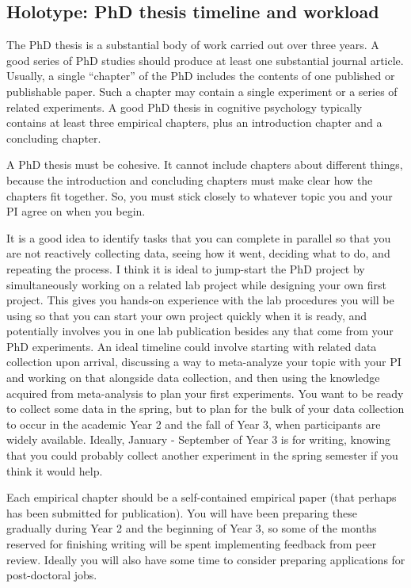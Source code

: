 \documentclass[
  12pt,
]{book}
\begin{document}
\subsection{Holotype: PhD thesis timeline and workload}\label{holotype-phd-thesis-timeline-and-workload}

The PhD thesis is a substantial body of work carried out over three years. A good series of PhD studies should produce at least one substantial journal article. Usually, a single ``chapter'' of the PhD includes the contents of one published or publishable paper. Such a chapter may contain a single experiment or a series of related experiments. A good PhD thesis in cognitive psychology typically contains at least three empirical chapters, plus an introduction chapter and a concluding chapter.

A PhD thesis must be cohesive. It cannot include chapters about different things, because the introduction and concluding chapters must make clear how the chapters fit together. So, you must stick closely to whatever topic you and your PI agree on when you begin.

It is a good idea to identify tasks that you can complete in parallel so that you are not reactively collecting data, seeing how it went, deciding what to do, and repeating the process. I think it is ideal to jump-start the PhD project by simultaneously working on a related lab project while designing your own first project. This gives you hands-on experience with the lab procedures you will be using so that you can start your own project quickly when it is ready, and potentially involves you in one lab publication besides any that come from your PhD experiments. An ideal timeline could involve starting with related data collection upon arrival, discussing a way to meta-analyze your topic with your PI and working on that alongside data collection, and then using the knowledge acquired from meta-analysis to plan your first experiments. You want to be ready to collect some data in the spring, but to plan for the bulk of your data collection to occur in the academic Year 2 and the fall of Year 3, when participants are widely available. Ideally, January - September of Year 3 is for writing, knowing that you could probably collect another experiment in the spring semester if you think it would help.

Each empirical chapter should be a self-contained empirical paper (that perhaps has been submitted for publication). You will have been preparing these gradually during Year 2 and the beginning of Year 3, so some of the months reserved for finishing writing will be spent implementing feedback from peer review. Ideally you will also have some time to consider preparing applications for post-doctoral jobs.
\end{document}
